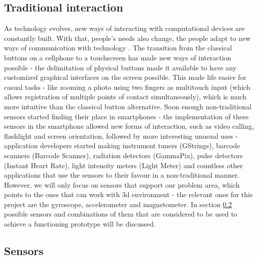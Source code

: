 \subsection{Traditional interaction}
As technology evolves, new ways of interacting with computational devices are constantly built. With that, people’s needs also change, the people adapt to new ways of communication with technology \cite{Greenfield}  %
. The transition from the classical buttons on a cellphone to a touchscreen has made new ways of interaction possible - the delimitation of physical buttons made it available to have any customized graphical interfaces on the screen possible. This made life easier for casual tasks - like zooming a photo using two fingers as multitouch input (which allows registration of multiple points of contact simultaneously), which is much more intuitive than the classical button alternative.
Soon enough non-traditional sensors started finding their place in smartphones - the implementation of these sensors in the smartphone allowed new forms of interaction, such as video calling, flashlight and screen orientation, followed by more interesting unusual uses - application developers started making instrument tuners (GStrings), barcode scanners (Barcode Scanner), radiation detectors (GammaPix), pulse detectors (Instant Heart Rate), light intensity meters (Light Meter) and countless other applications that use the sensors to their favour in a non-traditional manner. However, we will only focus on sensors that support our problem area, which points to the ones that can work with 3d environment - the relevant ones for this project are the gyroscope, accelerometer and magnetometer. In section \ref{sensors} possible sensors and combinations of them that are considered to be used to achieve a functioning prototype will be discussed. %


\subsection{Sensors} \label{sensors}

